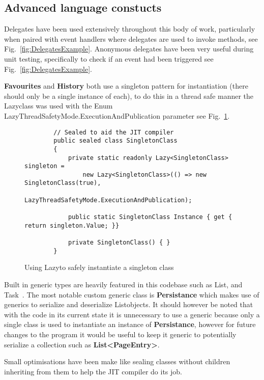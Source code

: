 \documentclass[../Main.tex]{subfiles}
\begin{document}
\subsection{Advanced language constucts}

Delegates have been used extensively throughout this body of work, particularly when paired with event handlers where delegates are used to invoke methods, see Fig.~\ref{fig:DelegatesExample}. Anonymous delegates have been very useful during unit testing, specifically to check if an event had been triggered see Fig.~\ref{fig:DelegatesExample}.~\autocite{billwagnerDelegatesProgrammingGuide}

\textbf{Favourites} and \textbf{History} both use a singleton pattern for instantiation (there should only be a single instance of each), to do this in a thread safe manner the Lazy\genT class was used with the Enum LazyThreadSafetyMode.ExecutionAndPublication parameter see Fig.~\ref{fig:LazySingletonExample}.~\autocite{dotnet-botLazyClassSystem,dotnet-botLazyThreadSafetyModeEnumSystem}

\begin{figure}[h]
    \begin{verbatim}
        // Sealed to aid the JIT compiler
        public sealed class SingletonClass
        {
            private static readonly Lazy<SingletonClass> singleton = 
                new Lazy<SingletonClass>(() => new SingletonClass(true),
                LazyThreadSafetyMode.ExecutionAndPublication);

            public static SingletonClass Instance { get { return singleton.Value; }}

            private SingletonClass() { }
        }

    \end{verbatim}
    \caption{Using Lazy\genT to safely instantiate a singleton class}
    \label{fig:LazySingletonExample}
\end{figure}


Built in generic types are heavily featured in this codebase such as List\genT, and Task\genT~\autocite{dotnet-botTaskClassSystema}. The most notable custom generic class is \textbf{Persistance\genT} which makes use of generics to serialize and deserialize List\genT objects. It should however be noted that with the code in its current state it is unnecessary to use a generic because only a single class is used to instantiate an instance of \textbf{Persistance\genT}, however for future changes to the program it would be useful to keep it generic to potentially serialize a collection such as \textbf{List\textless\ignorespaces PageEntry\textgreater}.

Small optimisations have been make like sealing classes without children inheriting from them to help the JIT compiler do its job.~\autocite{billwagnerSealedModifierReference}
\end{document}
